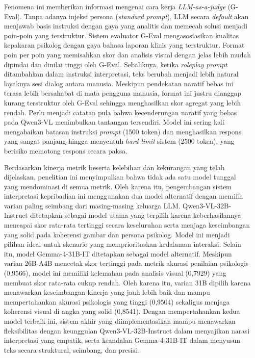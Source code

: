 Fenomena ini memberikan informasi mengenai cara kerja \textit{LLM-as-a-judge} (G-Eval). Tanpa adanya injeksi persona (\textit{standard prompt}), LLM secara \textit{default} akan menjawab basis instruksi dengan gaya yang analitis dan memecah solusi menjadi poin-poin yang terstruktur. Sistem evaluator G-Eval mengasosiasikan kualitas kepakaran psikolog dengan gaya bahasa laporan klinis yang terstruktur. Format poin per poin yang memisahkan skor dan analisis visual dengan jelas lebih mudah dipindai dan dinilai tinggi oleh G-Eval. Sebaliknya, ketika \textit{roleplay prompt} ditambahkan dalam instruksi interpretasi, teks berubah menjadi lebih natural layaknya sesi dialog antara manusia. Meskipun pendekatan naratif bebas ini terasa lebih bersahabat di mata pengguna manusia, format ini justru dianggap kurang terstruktur oleh G-Eval sehingga menghasilkan skor agregat yang lebih rendah. Perlu menjadi catatan pula bahwa kecenderungan naratif yang bebas pada Qwen3-VL menimbulkan tantangan tersendiri. Model ini sering kali mengabaikan batasan instruksi \textit{prompt} (1500 token) dan menghasilkan respons yang sangat panjang hingga menyentuh \textit{hard limit} sistem (2500 token), yang berisiko memotong respons secara paksa.

Berdasarkan kinerja metrik beserta kelebihan dan kekurangan yang telah dijelaskan, penelitian ini menyimpulkan bahwa tidak ada satu model tunggal yang mendominasi di semua metrik. Oleh karena itu, pengembangan sistem interpretasi kepribadian ini menggunakan dua model alternatif dengan memilih varian paling seimbang dari masing-masing keluarga LLM. Qwen3-VL-32B-Instruct ditetapkan sebagai model utama yang terpilih karena keberhasilannya mencapai skor rata-rata tertinggi secara keseluruhan serta menjaga keseimbangan yang solid pada koherensi gambar dan persona psikolog. Model ini menjadi pilihan ideal untuk skenario yang memprioritaskan kedalaman interaksi. Selain itu, model Gemma-4-31B-IT ditetapkan sebagai model alternatif. Meskipun varian 26B-A4B mencetak skor tertinggi pada metrik akurasi penilaian psikologis (0,9566), model ini memiliki kelemahan pada analisis visual (0,7929) yang membuat skor rata-rata cukup rendah. Oleh karena itu, varian 31B dipilih karena menawarkan keseimbangan kinerja yang jauh lebih baik dan mampu mempertahankan akurasi psikologis yang tinggi (0,9504) sekaligus menjaga koherensi visual di angka yang solid (0,8541). Dengan mempertahankan kedua model terbaik ini, sistem akhir yang diimplementasikan mampu menawarkan fleksibilitas dengan keunggulan Qwen3-VL-32B-Instruct dalam menyajikan narasi interpretasi yang empatik, serta keandalan Gemma-4-31B-IT dalam menyusun teks secara struktural, seimbang, dan presisi.

